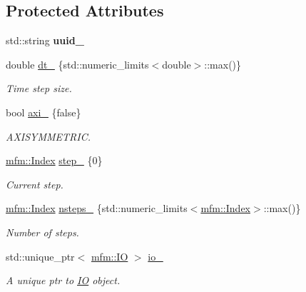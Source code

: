 \subsection*{Protected Attributes}
\begin{DoxyCompactItemize}
\item 
\mbox{\label{classmfm_1_1_m_f_m_ae4a3f4844f4d9affcc9b814fbd89be96}} 
std\+::string {\bfseries uuid\+\_\+}
\item 
\mbox{\label{classmfm_1_1_m_f_m_a48087e7734feaeb0a8cf763a57a4f97b}} 
double \hyperlink{classmfm_1_1_m_f_m_a48087e7734feaeb0a8cf763a57a4f97b}{dt\+\_\+} \{std\+::numeric\+\_\+limits$<$double$>$\+::max()\}
\begin{DoxyCompactList}\small\item\em Time step size. \end{DoxyCompactList}\item 
\mbox{\label{classmfm_1_1_m_f_m_a99a022cfd0a14d18a2b7e2449f35a8e1}} 
bool \hyperlink{classmfm_1_1_m_f_m_a99a022cfd0a14d18a2b7e2449f35a8e1}{axi\+\_\+} \{false\}
\begin{DoxyCompactList}\small\item\em A\+X\+I\+S\+Y\+M\+M\+E\+T\+R\+IC. \end{DoxyCompactList}\item 
\mbox{\label{classmfm_1_1_m_f_m_a6b438e05bf767bda02514754c2ec6336}} 
\hyperlink{namespacemfm_a7d021c8caa1852f673d78358edc6b7f9}{mfm\+::\+Index} \hyperlink{classmfm_1_1_m_f_m_a6b438e05bf767bda02514754c2ec6336}{step\+\_\+} \{0\}
\begin{DoxyCompactList}\small\item\em Current step. \end{DoxyCompactList}\item 
\mbox{\label{classmfm_1_1_m_f_m_a5c9d196210bf508441ae90fbaf617954}} 
\hyperlink{namespacemfm_a7d021c8caa1852f673d78358edc6b7f9}{mfm\+::\+Index} \hyperlink{classmfm_1_1_m_f_m_a5c9d196210bf508441ae90fbaf617954}{nsteps\+\_\+} \{std\+::numeric\+\_\+limits$<$\hyperlink{namespacemfm_a7d021c8caa1852f673d78358edc6b7f9}{mfm\+::\+Index}$>$\+::max()\}
\begin{DoxyCompactList}\small\item\em Number of steps. \end{DoxyCompactList}\item 
\mbox{\label{classmfm_1_1_m_f_m_a797d222412df1eb7fcb68a1527d40574}} 
std\+::unique\+\_\+ptr$<$ \hyperlink{classmfm_1_1_i_o}{mfm\+::\+IO} $>$ \hyperlink{classmfm_1_1_m_f_m_a797d222412df1eb7fcb68a1527d40574}{io\+\_\+}
\begin{DoxyCompactList}\small\item\em A unique ptr to \hyperlink{classmfm_1_1_i_o}{IO} object. \end{DoxyCompactList}\end{DoxyCompactItemize}


